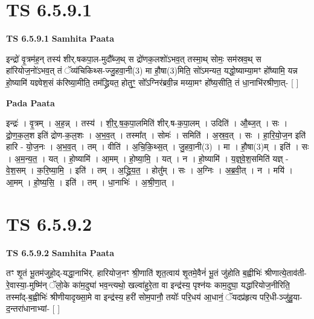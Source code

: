 \documentclass[17pt]{extarticle}
\begin{document}
\section*{ TS 6.5.9.1 }

\textbf{TS 6.5.9.1 } \newline
\textbf{Samhita Paata} \newline

इन्द्रो॑ वृ॒त्रम॑ह॒न् तस्य॑ शीर्.षकपा॒ल-मुदौ᳚ब्ज॒थ् स द्रो॑णक॒लशो॑ऽभव॒त् तस्मा॒थ् सोमः॒ सम॑स्रव॒थ् स हा॑रियोज॒नो॑ऽभव॒त् तं ॅव्य॑चिकिथ्स-ज्जु॒हवा॒नी(3) मा हौ॒षा(3)मिति॒ सो॑ऽमन्यत॒ यद्धो॒ष्याम्या॒मꣳ हो᳚ष्यामि॒ यन्न हो॒ष्यामि॑ यज्ञ्वेश॒सं क॑रिष्या॒मीति॒ तम॑द्ध्रियत॒ होतुꣳ॒॒ सो᳚ऽग्निर॑ब्रवी॒न्न मय्या॒मꣳ हो᳚ष्य॒सीति॒ तं धा॒नाभि॑रश्रीणा॒त्- [  ] \newline

\textbf{Pada Paata} \newline

इन्द्रः॑ । वृ॒त्रम् । अ॒ह॒न्न् । तस्य॑ । शी॒र्॒.ष॒क॒पा॒लमिति॑ शीर्.ष-क॒पा॒लम् । उदिति॑ । औ॒ब्ज॒त् । सः । द्रो॒ण॒क॒ल॒श इति॑ द्रोण-क॒ल॒शः । अ॒भ॒व॒त् । तस्मा᳚त् । सोमः॑ । समिति॑ । अ॒स्र॒व॒त् । सः । हा॒रि॒यो॒ज॒न इति॑ हारि - यो॒ज॒नः । अ॒भ॒व॒त् । तम् । वीति॑ । अ॒चि॒कि॒थ्स॒त् । जु॒हवा॒नी(3) । मा । हौ॒षा(3)म् । इति॑ । सः । अ॒म॒न्य॒त॒ । यत् । हो॒ष्यामि॑ । आ॒मम् । हो॒ष्या॒मि॒ । यत् । न । हो॒ष्यामि॑ । य॒ज्ञ्॒वे॒श॒समिति॑ यज्ञ् - वे॒श॒सम् । क॒रि॒ष्या॒मि॒ । इति॑ । तम् । अ॒द्ध्रि॒य॒त॒ । होतु᳚म् । सः । अ॒ग्निः । अ॒ब्र॒वी॒त् । न । मयि॑ । आ॒मम् । हो॒ष्य॒सि॒ । इति॑ । तम् । धा॒नाभिः॑ । अ॒श्री॒णा॒त् ।  \newline




\section*{ TS 6.5.9.2 }

\textbf{TS 6.5.9.2 } \newline
\textbf{Samhita Paata} \newline

तꣳ शृ॒तं भू॒तम॑जुहो॒द्-यद्धा॒नाभि॑र्. हारियोज॒नꣳ श्री॒णाति॑ शृत॒त्वाय॑ शृ॒तमे॒वैनं॑ भू॒तं जु॑होति ब॒ह्वीभिः॑ श्रीणात्ये॒ताव॑ती-रे॒वास्या॒-मुष्मि॑न् ॅलो॒के का॑म॒दुघा॑ भव॒न्त्यथो॒ खल्वा॑हुरे॒ता वा इन्द्र॑स्य॒ पृश्न॑यः काम॒दुघा॒ यद्धा॑रियोज॒नीरिति॒ तस्मा᳚द्-ब॒ह्वीभिः॑ श्रीणीयादृख्सा॒मे वा इन्द्र॑स्य॒ हरी॑ सोम॒पानौ॒ तयोः᳚ परि॒धय॑ आ॒धानं॒ ॅयदप्र॑हृत्य परि॒धी-ञ्जु॑हु॒या-द॒न्तरा॑धानाभ्यां- [  ] \newline
\end{document}
